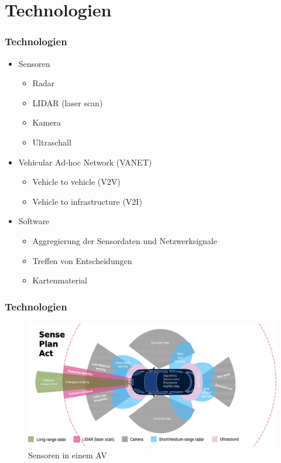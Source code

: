 \section{Technologien}

\begin{frame}
    \frametitle{Technologien} \pause

    \begin{itemize}
        \item Sensoren \cite{smith2015automated}
        \begin{itemize}
            \item Radar
            \item LIDAR (laser scan)
            \item Kamera
            \item Ultraschall \pause
        \end{itemize}
    
        \item Vehicular Ad-hoc Network (VANET) \cite{10.1007/978-3-642-31368-4_6}
        \begin{itemize}
            \item Vehicle to vehicle (V2V)
            \item Vehicle to infrastructure (V2I) \pause    
        \end{itemize}
        
        \item Software
        \begin{itemize}
            \item Aggregierung der Sensordaten und Netzwerksignale
            \item Treffen von Entscheidungen
            \item Kartenmaterial
        \end{itemize}
    \end{itemize}
\end{frame}

\begin{frame}
    \frametitle{Technologien}

    \begin{figure}[H]
        \centering
        \includegraphics[width=1.0\textwidth]{resources/images/sensors-av.png}
        \caption{Sensoren in einem AV \cite{sensors_img}}
    \end{figure}
\end{frame}

